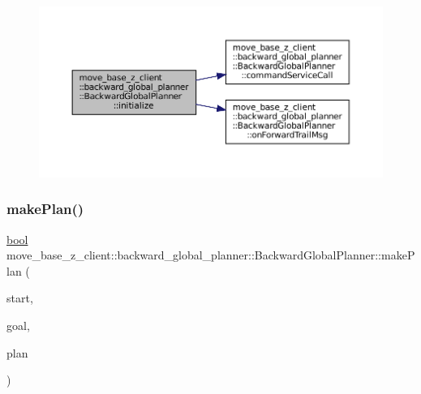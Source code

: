 \begin{figure}[H]
\begin{center}
\leavevmode
\includegraphics[width=350pt]{classmove__base__z__client_1_1backward__global__planner_1_1BackwardGlobalPlanner_a71d3610ea673cb9613eeeae842f028c3_cgraph}
\end{center}
\end{figure}
\mbox{\label{classmove__base__z__client_1_1backward__global__planner_1_1BackwardGlobalPlanner_af9441c1bd8d258281458ca7fa012e0e6}} 
\subsubsection{\texorpdfstring{make\+Plan()}{makePlan()}\hspace{0.1cm}{\footnotesize\ttfamily [1/2]}}
{\footnotesize\ttfamily \hyperlink{classbool}{bool} move\+\_\+base\+\_\+z\+\_\+client\+::backward\+\_\+global\+\_\+planner\+::\+Backward\+Global\+Planner\+::make\+Plan (\begin{DoxyParamCaption}\item[{const geometry\+\_\+msgs\+::\+Pose\+Stamped \&}]{start,  }\item[{const geometry\+\_\+msgs\+::\+Pose\+Stamped \&}]{goal,  }\item[{std\+::vector$<$ geometry\+\_\+msgs\+::\+Pose\+Stamped $>$ \&}]{plan }\end{DoxyParamCaption})}

